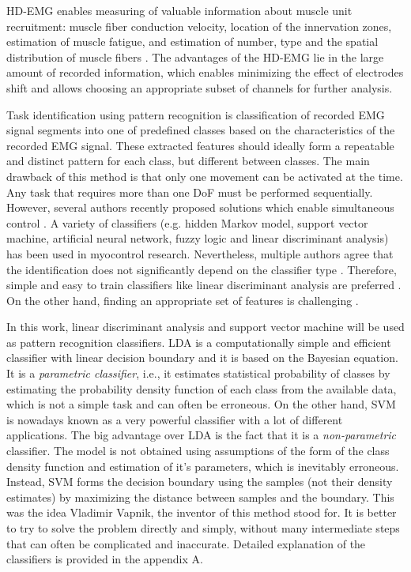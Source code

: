     HD-EMG enables measuring of valuable information about muscle unit recruitment: muscle fiber conduction velocity, location of the innervation zones, estimation of muscle fatigue, and estimation of number, type and the spatial distribution of muscle fibers \citep{Marateb2016}. The advantages of the HD-EMG lie in the large amount of recorded information, which enables minimizing the effect of electrodes shift and allows choosing an appropriate subset of channels for further analysis.
    
    
Task identification using pattern recognition is classification of recorded EMG signal segments into one of predefined classes based on the characteristics of the recorded EMG signal. These extracted features should ideally form a repeatable and distinct pattern for each class, but different between classes.  The main drawback of this method is that only one movement can be activated at the time. Any task that requires more than one DoF must be performed sequentially. However, several authors recently proposed solutions which enable simultaneous control \citep{Young2013, Kamavuako2013, Baker2010}. A variety of classifiers (e.g. hidden Markov model, support vector machine, artificial neural network, fuzzy logic and linear discriminant analysis) \citep{Oskoei2007} has been used in myocontrol research. Nevertheless, multiple authors agree that the identification does not significantly depend on the classifier type \citep{Hargrove2007, Zhang2012, Hakonen2015}. Therefore, simple and easy to train classifiers like linear discriminant analysis are preferred \citep{Li2010, Englehart1999, Tkach2010, Li2014, Hakonen2015}. On the other hand, finding an appropriate set of features is challenging \citep{Englehart1999, Tkach2010, Liu2013}.

In this work, linear discriminant analysis and support vector machine will be used as pattern recognition classifiers. LDA is a computationally simple and efficient classifier with linear decision boundary and it is based on the Bayesian equation. It is a \emph{parametric classifier}, i.e., it estimates statistical probability of classes by estimating the probability density function of each class from the available data, which is not a simple task and can often be erroneous. On the other hand, SVM is nowadays known as a very powerful classifier with a lot of different applications. The big advantage over LDA is the fact that it is a \emph{non-parametric} classifier. The model is not obtained using assumptions of the form of the class density function and estimation of it's parameters, which is inevitably erroneous. Instead, SVM forms the decision boundary using the samples (not their density estimates) by maximizing the distance between samples and the boundary. This was the idea Vladimir Vapnik, the inventor of this method stood for. It is better to try to solve the problem directly and simply, without many intermediate steps that can often be complicated and inaccurate. Detailed explanation of the classifiers is provided in the appendix A.

